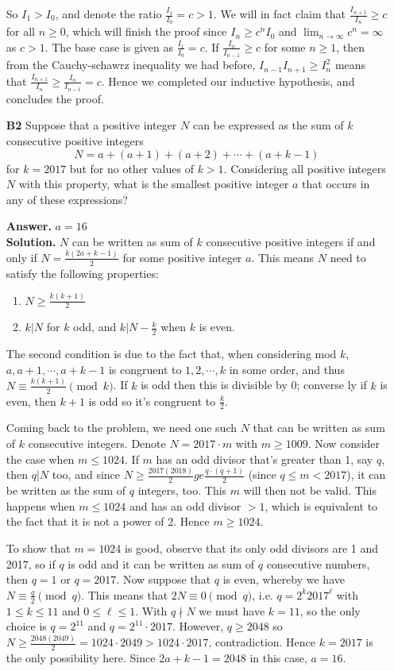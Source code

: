 \documentclass[11pt,a4paper]{article}
\begin{document}
\begin{enumerate}
So $I_1>I_0$, and denote the ratio $\frac{I_1}{I_0}=c>1$. We will in fact claim that $\frac{I_{n+1}}{I_n}\ge c$ for all $n\ge 0$, which will finish the proof since $I_n\ge c^nI_0$ and $\lim_{n\to\infty}c^n=\infty$ as $c>1$. The base case is given as $\frac{I_1}{I_0}=c$. If $\frac{I_{n}}{I_{n-1}}\ge c$ for some $n\ge 1$, then from the Cauchy-schawrz inequality we had before, $I_{n-1}I_{n+1}\ge I_n^2$ means that $\frac{I_{n+1}}{I_n}\ge \frac{I_n}{I_{n-1}}=c$. Hence we completed our inductive hypothesis, and concludes the proof. 

\item[\textbf{B2}]Suppose that a positive integer $N$ can be expressed as the sum of $k$ consecutive positive integers
\[N=a+(a+1)+(a+2)+\cdots+(a+k-1)\]for $k=2017$ but for no other values of $k>1.$ Considering all positive integers $N$ with this property, what is the smallest positive integer $a$ that occurs in any of these expressions?

\textbf{Answer.} $a=16$ \\
\textbf{Solution.} $N$ can be written as sum of $k$ consecutive positive integers if and only if $N=\frac{k(2a+k-1)}{2}$ for some positive integer $a$. This means $N$ need to satisfy the following properties: 
\begin{enumerate}
	\item $N\ge \frac{k(k+1)}{2}$
	\item $k|N$ for $k$ odd, and $k|N-\frac{k}{2}$ when $k$ is even. 
\end{enumerate}
The second condition is due to the fact that, when considering mod $k$, $a, a+1, \cdots , a+k-1$ is congruent to $1, 2, \cdots , k$ in some order, and thus $N\equiv \frac{k(k+1)}{2}\pmod{k}$. If $k$ is odd then this is divisible by 0; converse ly if $k$ is even, then $k+1$ is odd so it's congruent to $\frac{k}{2}$. 

Coming back to the problem, we need one such $N$ that can be written as sum of $k$ consecutive integers. Denote $N=2017\cdot m$ with $m\ge 1009$. Now consider the case when $m\le 1024$. If $m$ has an odd divisor that's greater than 1, say $q$, then $q|N$ too, and since $N\ge \frac{2017(2018)}{2}ge \frac{q\cdot (q+1)}{2}$ (since $q\le m< 2017$), it can be written as the sum of $q$ integers, too. This $m$ will then not be valid. This happens when $m\le 1024$ and has an odd divisor $>1$, which is equivalent to the fact that it is not a power of 2. Hence $m\ge 1024$. 

To show that $m=1024$ is good, observe that its only odd divisors are 1 and 2017, so if $q$ is odd and it can be written as sum of $q$ consecutive numbers, then $q=1$ or $q=2017$. Now suppose that $q$ is even, whereby we have $N\equiv \frac{q}{2}\pmod{q}$. This means that $2N\equiv 0\pmod{q}$, i.e. $q=2^k 2017^{\ell}$ with $1\le k\le 11$ and $0\le\ell\le 1$. With $q\nmid N$ we must have $k=11$, so the only choice is $q=2^{11}$ and $q=2^{11}\cdot 2017$. However, $q\ge 2048$ so $N\ge \frac{2048(2049)}{2}=1024\cdot 2049>1024\cdot 2017$, contradiction. Hence $k=2017$ is the only possibility here. Since $2a+k-1=2048$ in this case, $a=16$. 


\end{enumerate}
\end{document}
